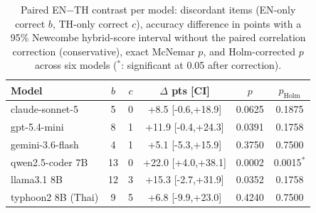 \begin{table}[t]
\caption{Paired EN$-$TH contrast per model: discordant items (EN-only
correct $b$, TH-only correct $c$), accuracy difference in points with a
95\% Newcombe hybrid-score interval without the paired correlation correction (conservative), exact McNemar $p$, and Holm-corrected $p$ across six
models ($^{*}$: significant at 0.05 after correction).}
\label{tab:crosslingual}
\centering\footnotesize\setlength{\tabcolsep}{3.5pt}
\begin{tabular}{lccccc}
\toprule
Model & $b$ & $c$ & $\Delta$ pts [CI] & $p$ & $p_{\text{Holm}}$ \\
\midrule
claude-sonnet-5 & 5 & 0 & +8.5 [-0.6,+18.9] & 0.0625 & 0.1875 \\
gpt-5.4-mini & 8 & 1 & +11.9 [-0.4,+24.3] & 0.0391 & 0.1758 \\
gemini-3.6-flash & 4 & 1 & +5.1 [-5.3,+15.9] & 0.3750 & 0.7500 \\
qwen2.5-coder 7B & 13 & 0 & +22.0 [+4.0,+38.1] & 0.0002 & 0.0015$^{*}$ \\
llama3.1 8B & 12 & 3 & +15.3 [-2.7,+31.9] & 0.0352 & 0.1758 \\
typhoon2 8B (Thai) & 9 & 5 & +6.8 [-9.9,+23.0] & 0.4240 & 0.7500 \\
\bottomrule
\end{tabular}
\end{table}
